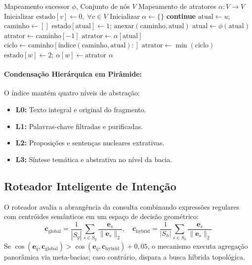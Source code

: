 \documentclass[10pt,twocolumn]{article}
\theoremstyle{definition}
\begin{document}
\begin{algorithm}[t]
\caption{Identificação Linear de Atratores}
\label{alg:attractor_detection_pt}
\small
\begin{algorithmic}[1]
\Require Mapeamento sucessor $\phi$, Conjunto de nós $V$
\Ensure Mapeamento de atratores $\alpha: V \to V$
\State Inicializar $\text{estado}[v] \gets 0, \; \forall v \in V$
\State Inicializar $\alpha \gets \{\}$
     \textbf{continue} \EndIf
    \State $\text{atual} \gets u$; $\text{caminho} \gets []$
        \State $\text{estado}[\text{atual}] \gets 1$; $\text{anexar}(\text{caminho}, \text{atual})$
        \State $\text{atual} \gets \phi(\text{atual})$
    \EndWhile
        \State $\text{atrator} \gets \text{caminho}[-1]$
        \State $\text{atrator} \gets \alpha[\text{atual}]$
        \State $\text{ciclo} \gets \text{caminho}[\text{índice}(\text{caminho}, \text{atual}):]$
        \State $\text{atrator} \gets \min(\text{ciclo})$
    \EndIf
        \State $\text{estado}[w] \gets 2$; $\alpha[w] \gets \text{atrator}$
    \EndFor
\EndFor
\State \Return $\alpha$
\end{algorithmic}
\end{algorithm}

\paragraph{Condensação Hierárquica em Pirâmide:}
O índice mantém quatro níveis de abstração:
\begin{itemize}
    \item \textbf{L0:} Texto integral e original do fragmento.
    \item \textbf{L1:} Palavras-chave filtradas e purificadas.
    \item \textbf{L2:} Proposições e sentenças nucleares extrativas.
    \item \textbf{L3:} Síntese temática e abstrativa no nível da bacia.
\end{itemize}

\subsection{Roteador Inteligente de Intenção}

O roteador avalia a abrangência da consulta combinando expressões regulares com centróides semânticos em um espaço de decisão geométrico:
\begin{equation}
\mathbf{c}_{\text{global}} = \frac{1}{|S_g|} \sum_{s \in S_g} \frac{\mathbf{e}_s}{\|\mathbf{e}_s\|_2}, \quad \mathbf{c}_{\text{hybrid}} = \frac{1}{|S_h|} \sum_{s \in S_h} \frac{\mathbf{e}_s}{\|\mathbf{e}_s\|_2}
\end{equation}
Se $\cos(\mathbf{e}_q, \mathbf{c}_{\text{global}}) > \cos(\mathbf{e}_q, \mathbf{c}_{\text{hybrid}}) + 0,05$, o mecanismo executa agregação panorâmica via meta-bacias; caso contrário, dispara a busca híbrida topológica.
\end{document}

